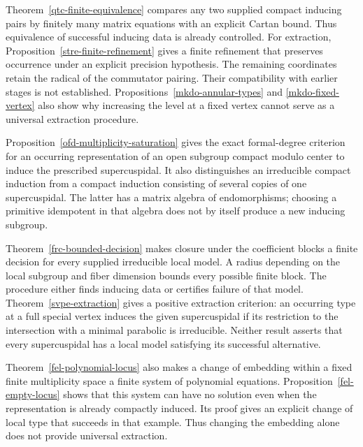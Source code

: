 \documentclass[10pt]{amsart}
\begin{document}
Theorem~\ref{qtc-finite-equivalence} compares any two supplied compact inducing
pairs by finitely many matrix equations with an explicit Cartan bound. Thus
equivalence of successful inducing data is already controlled. For extraction,
Proposition~\ref{stre-finite-refinement} gives a finite refinement that preserves
occurrence under an explicit precision hypothesis. The remaining coordinates
retain the radical of the commutator pairing. Their compatibility with earlier
stages is not established. Propositions~\ref{mkdo-annular-types} and
\ref{mkdo-fixed-vertex} also show why increasing the level at a fixed vertex
cannot serve as a universal extraction procedure.

Proposition~\ref{ofd-multiplicity-saturation} gives the exact formal-degree
criterion for an occurring representation of an open subgroup compact modulo
center to induce the prescribed supercuspidal. It also distinguishes an
irreducible compact induction from a compact induction consisting of several
copies of one supercuspidal. The latter has a matrix algebra of endomorphisms;
choosing a primitive idempotent in that algebra does not by itself produce a
new inducing subgroup.

Theorem~\ref{frc-bounded-decision} makes closure under the coefficient blocks
a finite decision for every supplied irreducible local model. A radius
depending on the local subgroup and fiber dimension bounds every possible
finite block. The procedure either finds inducing data or certifies failure
of that model. Theorem~\ref{svpe-extraction} gives a positive extraction
criterion: an occurring type at a full special vertex induces the given
supercuspidal if its restriction to the intersection with a minimal
parabolic is irreducible. Neither result asserts that every supercuspidal
has a local model satisfying its successful alternative.

Theorem~\ref{fel-polynomial-locus} also makes a change of embedding within
a fixed finite multiplicity space a finite system of polynomial equations.
Proposition~\ref{fel-empty-locus} shows that this system can have no solution
even when the representation is already compactly induced. Its proof gives
an explicit change of local type that succeeds in that example. Thus
changing the embedding alone does not provide universal extraction.
\end{document}
